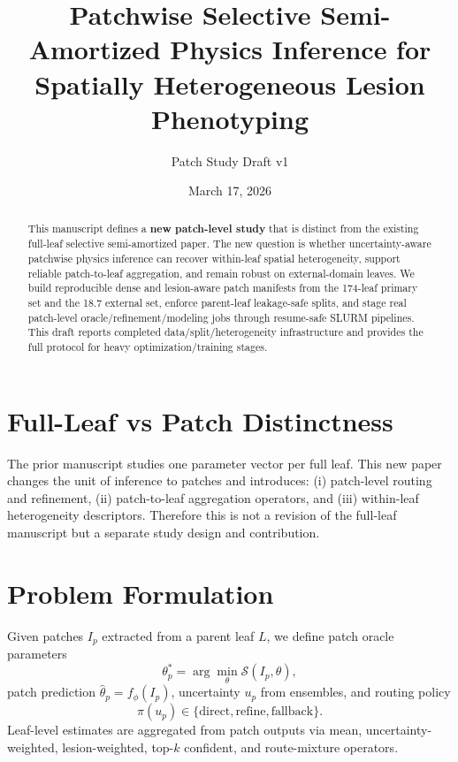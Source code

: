 \documentclass[11pt,a4paper]{article}
\title{Patchwise Selective Semi-Amortized Physics Inference for Spatially Heterogeneous Lesion Phenotyping}
\author{Patch Study Draft v1}
\date{March 17, 2026}
\begin{document}
\maketitle

\begin{abstract}
This manuscript defines a \textbf{new patch-level study} that is distinct from the existing full-leaf selective semi-amortized paper. The new question is whether uncertainty-aware patchwise physics inference can recover within-leaf spatial heterogeneity, support reliable patch-to-leaf aggregation, and remain robust on external-domain leaves. We build reproducible dense and lesion-aware patch manifests from the 174-leaf primary set and the 18.7 external set, enforce parent-leaf leakage-safe splits, and stage real patch-level oracle/refinement/modeling jobs through resume-safe SLURM pipelines. This draft reports completed data/split/heterogeneity infrastructure and provides the full protocol for heavy optimization/training stages.
\end{abstract}

\section{Full-Leaf vs Patch Distinctness}
The prior manuscript studies one parameter vector per full leaf. This new paper changes the unit of inference to patches and introduces: (i) patch-level routing and refinement, (ii) patch-to-leaf aggregation operators, and (iii) within-leaf heterogeneity descriptors. Therefore this is not a revision of the full-leaf manuscript but a separate study design and contribution.

\section{Problem Formulation}
Given patches $I_{p}$ extracted from a parent leaf $L$, we define patch oracle parameters
\begin{equation}
\theta^{*}_{p}=\arg\min_{\theta} \mathcal{S}(I_{p},\theta),
\end{equation}
patch prediction $\hat{\theta}_{p}=f_{\phi}(I_{p})$, uncertainty $u_{p}$ from ensembles, and routing policy
\begin{equation}
\pi(u_p)\in\{\text{direct},\text{refine},\text{fallback}\}.
\end{equation}
Leaf-level estimates are aggregated from patch outputs via mean, uncertainty-weighted, lesion-weighted, top-$k$ confident, and route-mixture operators.
\end{document}
